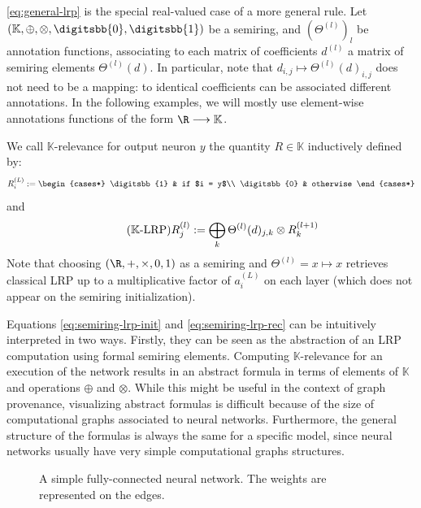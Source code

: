 \documentclass[twocolumn]{../cs-classes/cs-classes}
\newcommand*{\K}{\mathbb{K}}
\newcommand*{\1}{\digitsbb{1}}
\newcommand*{\0}{\digitsbb{0}}
\begin{document}
\autoref{eq:general-lrp} is the special real-valued case of a more general rule. Let $(\K, \oplus, \otimes, \0, \1)$ be a semiring, and $(\Theta^{(l)})_l$ be annotation functions, associating to each matrix of coefficients $d^{(l)}$ a matrix of semiring elements $\Theta^{(l)}(d)$. In particular, note that $d_{i,j} \mapsto \Theta^{(l)}(d)_{i,j}$ does not need to be a mapping: to identical coefficients can be associated different annotations. In the following examples, we will mostly use element-wise annotations functions of the form $\R\longrightarrow\K$.

We call $\K$-relevance for output neuron $y$ the quantity $R\in\K$ inductively defined by:
\begin{equation}
    R^{(L)}_i := \begin{cases*}
        \1 & if $i = y$\\
        \0 & otherwise
    \end{cases*}
    \label{eq:semiring-lrp-init}
\end{equation}
and
\begin{equation}
    \tag{$\K$-LRP}
    R^{(l)}_j := \bigoplus_{k}\Theta^{(l)}(d)_{j,k} \otimes R^{(l+1)}_k
    \label{eq:semiring-lrp-rec}
\end{equation}
Note that choosing $(\R,+,\times,0,1)$ as a semiring and $\Theta^{(l)}=x\mapsto x$ retrieves classical LRP up to a multiplicative factor of $a_i^{(L)}$ on each layer (which does not appear on the semiring initialization).

Equations \ref{eq:semiring-lrp-init} and \ref{eq:semiring-lrp-rec} can be intuitively interpreted in two ways. Firstly, they can be seen as the abstraction of an LRP computation using formal semiring elements. Computing $\K$-relevance for an execution of the network results in an abstract formula in terms of elements of $\K$ and operations $\oplus$ and $\otimes$. While this might be useful in the context of graph provenance, visualizing abstract formulas is difficult because of the size of computational graphs associated to neural networks. Furthermore, the general structure of the formulas is always the same for a specific model, since neural networks usually have very simple computational graphs structures. 

\begin{figure}[H]
    \centering
    
    \caption{A simple fully-connected neural network. The weights are represented on the edges.}
\end{figure}
\end{document}
